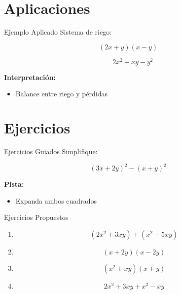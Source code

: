 \documentclass[aspectratio=169,12pt]{beamer}
\begin{document}
	\section{Aplicaciones}
	
	\begin{frame}{Ejemplo Aplicado}
		Sistema de riego:
		
		\[
		(2x + y)(x - y)
		\]
		
		\pause
		
		\[
		= 2x^2 - xy - y^2
		\]
		
		\pause
		
		\textbf{Interpretación:}
		\begin{itemize}
			\item Balance entre riego y pérdidas
		\end{itemize}
		
	\end{frame}
	
	\section{Ejercicios}
	
	\begin{frame}{Ejercicios Guiados}
		Simplifique:
		
		\pause
		
		\[
		(3x + 2y)^2 - (x+y)^2
		\]
		
		\pause
		
		\textbf{Pista:}
		\begin{itemize}
			\item Expanda ambos cuadrados
		\end{itemize}
		
	\end{frame}
	
	\begin{frame}{Ejercicios Propuestos}
		\begin{enumerate}
			\item 
			\[
			(2x^2 + 3xy) + (x^2 - 5xy)
			\]
			
			\pause
			
			\item 
			\[
			(x+2y)(x-2y)
			\]
			
			\pause
			
			\item 
			\[
			(x^2 + xy)(x+y)
			\]
			
			\pause
			
			\item 
			\[
			2x^2 + 3xy + x^2 - xy
			\]
			
		\end{enumerate}
		
	\end{frame}
	
\end{document}
